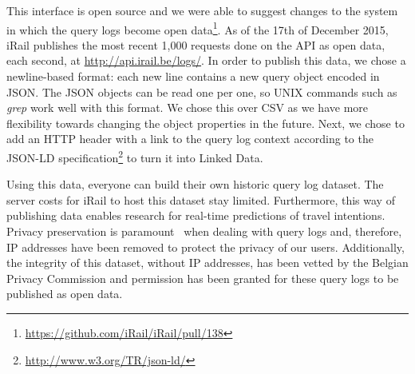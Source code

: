 \documentclass{sig-alternate}
\begin{document}
This interface is open source and we were able to suggest changes to the system in which the query logs become open data\footnote{\url{https://github.com/iRail/iRail/pull/138}}.
As of the 17th of December 2015, iRail publishes the most recent 1,000 requests done on the API as open data, each second, at \url{http://api.irail.be/logs/}.
In order to publish this data, we chose a newline-based format: each new line contains a new query object encoded in JSON. 
The JSON objects can be read one per one, so UNIX commands such as \emph{grep} work well with this format.
We chose this over CSV as we have more flexibility towards changing the object properties in the future.
Next, we chose to add an HTTP header with a link to the query log context according to the JSON-LD specification\footnote{\url{http://www.w3.org/TR/json-ld/}} to turn it into Linked Data.

Using this data, everyone can build their own historic query log dataset.
The server costs for iRail to host this dataset stay limited.
Furthermore, this way of publishing data enables research for real-time predictions of travel intentions.
Privacy preservation is paramount~\cite{silvestri} when dealing with query logs and, therefore, IP addresses have been removed to protect the privacy of our users. 
Additionally, the integrity of this dataset, without IP addresses, has been vetted by the Belgian Privacy Commission and permission has been granted for these query logs to be published as open data.
\end{document}
